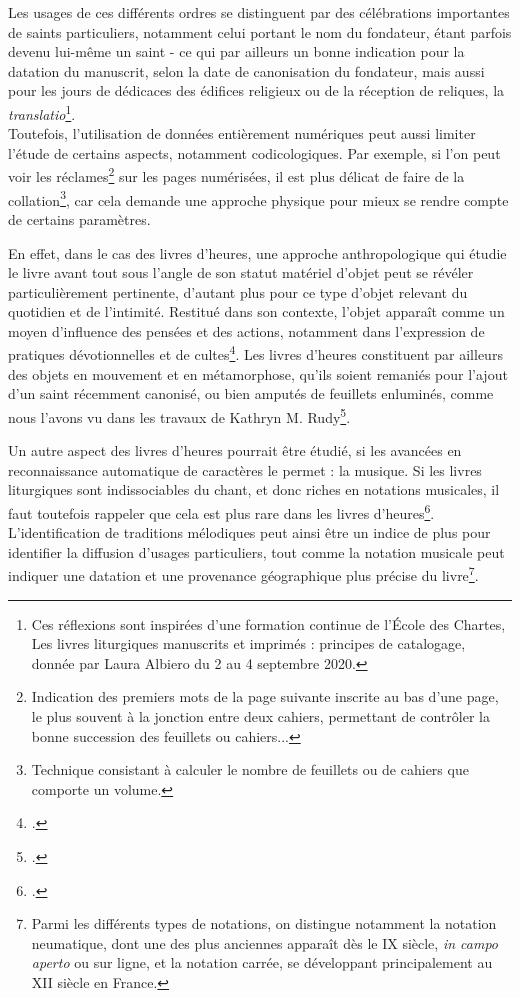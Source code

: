 \documentclass[a4paper,12pt,twoside]{book}
\begin{document}
	Les usages de ces différents ordres se distinguent par des célébrations importantes de saints particuliers, notamment celui portant le nom du fondateur, étant parfois devenu lui-même un saint - ce qui par ailleurs un bonne indication pour la datation du manuscrit, selon la date de canonisation du fondateur, mais aussi pour les jours de dédicaces des édifices religieux ou de la réception de reliques, la \textit{translatio}\footnote{Ces réflexions sont inspirées d'une formation continue de l'École des Chartes, \og Les livres liturgiques manuscrits et imprimés : principes de catalogage\fg{}, donnée par Laura Albiero du 2 au 4 septembre 2020.}.\\
	
	Toutefois, l'utilisation de données entièrement numériques peut aussi limiter l'étude de certains aspects, notamment codicologiques. Par exemple, si l'on peut voir les réclames\footnote{\og Indication des premiers mots de la page suivante inscrite au bas d'une page, le plus souvent à la jonction entre deux cahiers, permettant de contrôler la bonne succession des feuillets ou cahiers.\fg{}.\cite{dico_codicologie}.} sur les pages numérisées, il est plus délicat de faire de la collation\footnote{Technique consistant à calculer le nombre de feuillets ou de cahiers que comporte un volume.}, car cela demande une approche physique pour mieux se rendre compte de certains paramètres. 
	
	En effet, dans le cas des livres d'heures, une approche anthropologique qui étudie le livre avant tout sous l'angle de son statut matériel d'objet peut se révéler particulièrement pertinente, d'autant plus pour ce type d'objet relevant du quotidien et de l'intimité. Restitué dans son contexte, l'objet apparaît comme un moyen d'influence des pensées et des actions, notamment dans l'expression de pratiques dévotionnelles et de cultes\footcite[p. 262]{Art_Agency}. Les livres d'heures constituent par ailleurs des objets en mouvement et en métamorphose, qu'ils soient remaniés pour l'ajout d'un saint récemment canonisé, ou bien amputés de feuillets enluminés, comme nous l'avons vu dans les travaux de Kathryn M. Rudy\footcite{Piety_in_Pieces}.
	
	Un autre aspect des livres d'heures pourrait être étudié, si les avancées en reconnaissance automatique de caractères le permet : la musique. Si les livres liturgiques sont indissociables du chant, et donc riches en notations musicales, il faut toutefois rappeler que cela est plus rare dans les livres d'heures\footcite[p. 57]{Music_Livre_Heures}. L'identification de traditions mélodiques peut ainsi être un indice de plus pour identifier la diffusion d'usages particuliers, tout comme la notation musicale peut indiquer une datation et une provenance géographique plus précise du livre\footnote{Parmi les différents types de notations, on distingue notamment la notation neumatique, dont une des plus anciennes apparaît dès le \textsc{IX} siècle, \textit{in campo aperto} ou sur ligne, et la notation carrée, se développant principalement au \textsc{XII} siècle en France.}. \\
	
\end{document}
